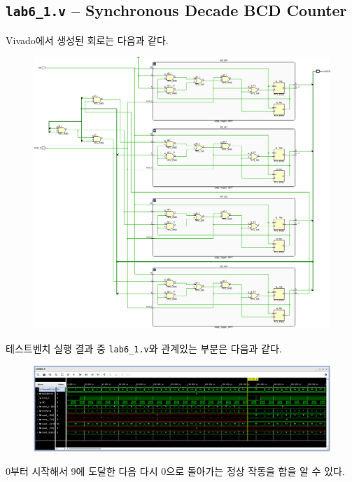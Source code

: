\documentclass{scrartcl}
\begin{document}
\subsection{\texttt{lab6\_1.v} -- Synchronous Decade BCD Counter}
Vivado에서 생성된 회로는 다음과 같다.
\begin{figure}[H]
  \centering
  \includegraphics[width=0.9\linewidth]{lab6_1_schematic-crop.pdf}
\end{figure}

테스트벤치 실행 결과 중 \texttt{lab6\_1.v}와 관계있는 부분은 다음과 같다.
\begin{figure}[H]
  \centering
  \includegraphics[width=0.9\linewidth]{lab6_1_waveform.png}
\end{figure}
0부터 시작해서 9에 도달한 다음 다시 0으로 돌아가는 정상 작동을 함을 알 수 있다.
\end{document}
